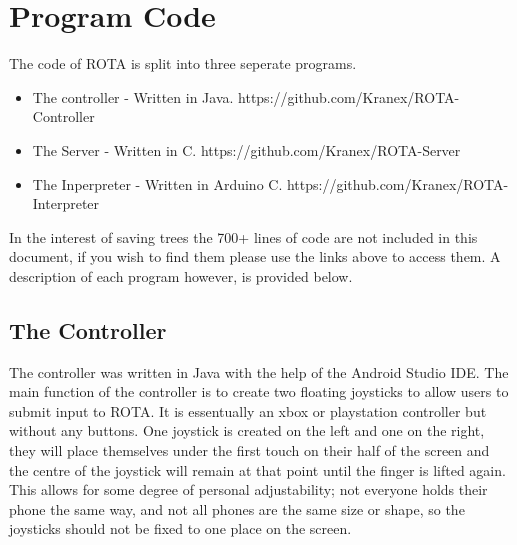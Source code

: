 \section{Program Code}
\par The code of ROTA is split into three seperate programs.
\begin{itemize}
  \item The controller - Written in Java. https://github.com/Kranex/ROTA-Controller
  \item The Server - Written in C. https://github.com/Kranex/ROTA-Server
  \item The Inperpreter - Written in Arduino C. https://github.com/Kranex/ROTA-Interpreter
\end{itemize}
In the interest of saving trees the 700+ lines of code are not included in this document,
if you wish to find them please use the links above to access them. A description of
each program however, is provided below.

\subsection{The Controller}
\par
The controller was written in Java with the help of the Android Studio IDE.
The main function of the controller is to create two floating joysticks to allow
users to submit input to ROTA. It is essentually an xbox or playstation controller
but without any buttons.
One joystick is created on the left and one on the right, they will place themselves
under the first touch on their half of the screen and the centre of the joystick
will remain at that point until the finger is lifted again. This allows for some
degree of personal adjustability; not everyone holds their phone the same way,
and not all phones are the same size or shape, so the joysticks should not be fixed
to one place on the screen.

